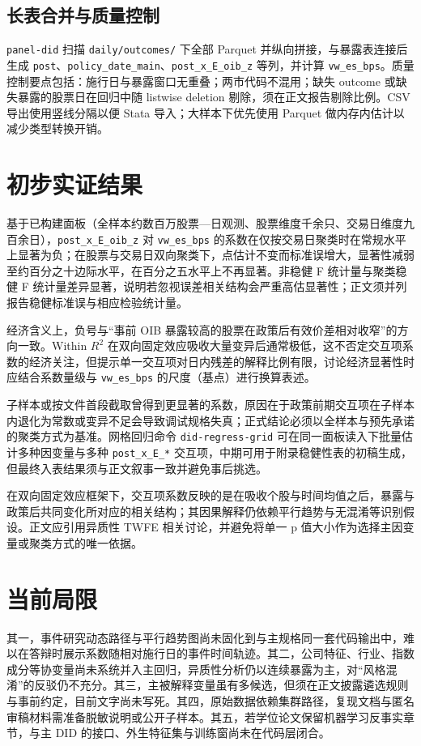 \documentclass[UTF8, a4paper, 12pt]{ctexart}
\newcommand{\id}[1]{{\footnotesize\nolinkurl{#1}}}
\begin{document}
\subsection{长表合并与质量控制}

\id{panel-did} 扫描 \id{daily/outcomes/} 下全部 Parquet 并纵向拼接，与暴露表连接后生成 \id{post}、\id{policy_date_main}、\id{post_x_E_oib_z} 等列，并计算 \id{vw_es_bps}。质量控制要点包括：施行日与暴露窗口无重叠；两市代码不混用；缺失 outcome 或缺失暴露的股票日在回归中随 listwise deletion 剔除，须在正文报告剔除比例。CSV 导出使用竖线分隔以便 Stata 导入；大样本下优先使用 Parquet 做内存内估计以减少类型转换开销。

\section{初步实证结果}

基于已构建面板（全样本约数百万股票—日观测、股票维度千余只、交易日维度九百余日），\id{post_x_E_oib_z} 对 \id{vw_es_bps} 的系数在仅按交易日聚类时在常规水平上显著为负；在股票与交易日双向聚类下，点估计不变而标准误增大，显著性减弱至约百分之十边际水平，在百分之五水平上不再显著。非稳健 F 统计量与聚类稳健 F 统计量差异显著，说明若忽视误差相关结构会严重高估显著性；正文须并列报告稳健标准误与相应检验统计量。

经济含义上，负号与“事前 OIB 暴露较高的股票在政策后有效价差相对收窄”的方向一致。Within \(R^2\) 在双向固定效应吸收大量变异后通常极低，这不否定交互项系数的经济关注，但提示单一交互项对日内残差的解释比例有限，讨论经济显著性时应结合系数量级与 \id{vw_es_bps} 的尺度（基点）进行换算表述。

子样本或按文件首段截取曾得到更显著的系数，原因在于政策前期交互项在子样本内退化为常数或变异不足会导致调试规格失真；正式结论必须以全样本与预先承诺的聚类方式为基准。网格回归命令 \id{did-regress-grid} 可在同一面板读入下批量估计多种因变量与多种 \id{post_x_E_*} 交互项，中期可用于附录稳健性表的初稿生成，但最终入表结果须与正文叙事一致并避免事后挑选。

在双向固定效应框架下，交互项系数反映的是在吸收个股与时间均值之后，暴露与政策后共同变化所对应的相关结构；其因果解释仍依赖平行趋势与无混淆等识别假设。正文应引用异质性 TWFE 相关讨论，并避免将单一 p 值大小作为选择主因变量或聚类方式的唯一依据。

\section{当前局限}

其一，事件研究动态路径与平行趋势图尚未固化到与主规格同一套代码输出中，难以在答辩时展示系数随相对施行日的事件时间轨迹。其二，公司特征、行业、指数成分等协变量尚未系统并入主回归，异质性分析仍以连续暴露为主，对“风格混淆”的反驳仍不充分。其三，主被解释变量虽有多候选，但须在正文披露遴选规则与事前约定，目前文字尚未写死。其四，原始数据依赖集群路径，复现文档与匿名审稿材料需准备脱敏说明或公开子样本。其五，若学位论文保留机器学习反事实章节，与主 DID 的接口、外生特征集与训练窗尚未在代码层闭合。
\end{document}
